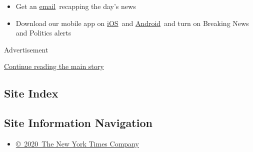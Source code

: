 \begin{itemize}
  \begin{itemize}
  \item
    Get an
    \href{https://www.nytimes3xbfgragh.onion/newsletters/politics?action=click\&pgtype=Article\&state=default\&region=BELOW_MAIN_CONTENT\&context=storylines_guide}{email}~recapping
    the day's news
  \item
    Download our mobile app on
    \href{https://apps.apple.com/us/app/nytimes/id284862083?ls=1\&mat_click_id=5c79ae7455014fd1bd66b5610c05b8f2-20191112-16948\&referrer=mat_click_id\%3D5c79ae7455014fd1bd66b5610c05b8f2-20191112-16948\%26link_click_id\%3D722930677036718082}{iOS}~and
    \href{http://a.localytics.com/android?id=com.nytimes.android\&referrer=utm_source\%3Dother_nyt_mobile_web\%26utm_medium\%3DWeb\%2520page\%26utm_term\%3DGeneral\%2520Mobile\%2520Page\%26utm_campaign\%3DNYT\%2520Mobile\%2520General\%2520Page}{Android}~and
    turn on Breaking News and Politics alerts
  \end{itemize}
\end{itemize}

Advertisement

\protect\hyperlink{after-bottom}{Continue reading the main story}

\hypertarget{site-index}{%
\subsection{Site Index}\label{site-index}}

\hypertarget{site-information-navigation}{%
\subsection{Site Information
Navigation}\label{site-information-navigation}}

\begin{itemize}
\tightlist
\item
  \href{https://help.nytimes3xbfgragh.onion/hc/en-us/articles/115014792127-Copyright-notice}{©~2020~The
  New York Times Company}
\end{itemize}


